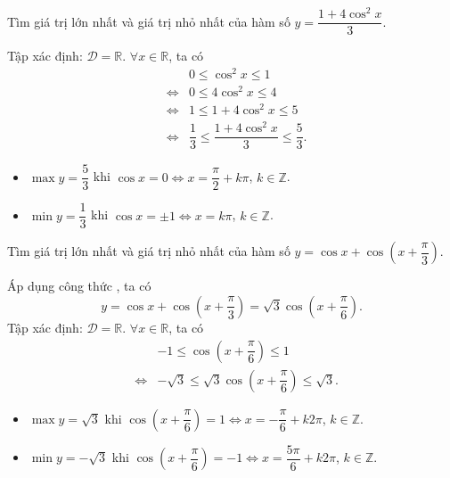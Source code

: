 \begin{vd}%
	[Mức độ 2]
	Tìm giá trị lớn nhất và giá trị nhỏ nhất của hàm số $ y=\dfrac{1+4 \cos^2 x}{3} $.
	\loigiai
	{
		Tập xác định: $ \mathscr{D}=\mathbb{R}$. $ \forall x \in \mathbb{R} $, ta có 
		\begin{eqnarray*}
			&& 0\leq \cos^2 x \leq 1\\
			&\Leftrightarrow& 0\leq 4\cos^2 x \leq 4\\
			&\Leftrightarrow& 1\leq 1+4\cos^2 x \leq 5\\
			&\Leftrightarrow& \dfrac{1}{3}\leq \dfrac{1+4\cos^2 x}{3} \leq \dfrac{5}{3}.
		\end{eqnarray*}
	\begin{itemize}
		\item $ \max y=\dfrac{5}{3} $ khi $ \cos x=0 \Leftrightarrow x=\dfrac{\pi}{2}+k\pi$, $k\in \mathbb{Z}$.
		\item $ \min y=\dfrac{1}{3} $ khi $ \cos  x=\pm1 \Leftrightarrow x=k\pi$, $k\in \mathbb{Z}$.
	\end{itemize}
	}
\end{vd}

\begin{vd}%
	[Mức độ 2]
	Tìm giá trị lớn nhất và giá trị nhỏ nhất của hàm số $ y=\cos x+\cos \left(x+\dfrac{\pi}{3}\right) $.
	\loigiai
	{
		Áp dụng công thức , ta có
		\begin{equation*}
			y=\cos x+\cos \left (x+\dfrac{\pi}{3}\right )=\sqrt{3}\cos \left (x+\dfrac{\pi}{6}\right ).
		\end{equation*}
		Tập xác định: $ \mathscr{D}=\mathbb{R}$. $ \forall x \in \mathbb{R} $, ta có
		\begin{eqnarray*}
			&&-1 \leq \cos \left (x+\dfrac{\pi}{6}\right ) \leq 1\\
			&\Leftrightarrow&  -\sqrt{3} \leq \sqrt{3}\cos \left (x+\dfrac{\pi}{6}\right ) \leq \sqrt{3}.
		\end{eqnarray*}
	\begin{itemize}
		\item $ \max y=\sqrt{3} $ khi $ \cos \left (x+\dfrac{\pi}{6}\right ) =1 \Leftrightarrow x=-\dfrac{\pi}{6}+k2\pi$, $k\in \mathbb{Z}$.
		\item $ \min y=-\sqrt{3} $ khi $ \cos \left (x+\dfrac{\pi}{6}\right )=-1 \Leftrightarrow x=\dfrac{5\pi}{6}+k2\pi$, $k\in \mathbb{Z}$.
	\end{itemize}
	}
\end{vd}


